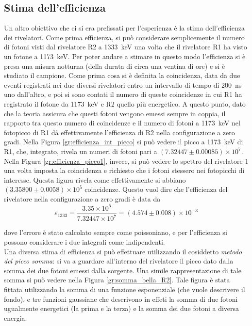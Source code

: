 \subsection{Stima dell'efficienza}
Un altro obiettivo che ci si era prefissati per l'esperienza è la stima dell'efficienza dei rivelatori. Come prima efficienza, si può considerare semplicemente il numero
di fotoni visti dal rivelatore R2 a 1333~keV una volta che il rivelatore R1 ha visto un fotone a 1173~keV. Per poter andare a stimare in questo modo l'efficienza si è presa
una misura notturna (della durata di circa una ventina di ore) e si è studiato il campione. Come prima cosa si è definita la coincidenza, data da due eventi
registrati nei due diversi rivelatori entro un intervallo di tempo di 200~ns uno dall'altro, e poi si sono contati il numero di queste coincidenze in cui R1 ha registrato
il fotone da 1173~keV e R2 quello più energetico. A questo punto, dato che la teoria assicura che questi fotoni vengono emessi sempre in coppia, il rapporto tra questo
numero di coincidenze e il numero di fotoni a 1173~keV nel fotopicco di R1 dà effettivamente l'efficienza di R2 nella configurazione a zero gradi. Nella
Figura \ref{gr:efficienza_int_picco} si può vedere il picco a 1173~keV di R1, che, integrato, rivela un numeri di fotoni pari a $(7.32447 \pm 0.00085)\times 10^7$.
Nella Figura \ref{gr:efficienza_picco1}, invece, si può vedere lo spettro del rivelatore 1 una volta imposta la coincidenza e richiesto che i fotoni stessero
nei fotopicchi di interesse. Questa figura rivela come effettivamente si abbiano $(3.35800 \pm 0.0058)\times 10^5$ coincidenze. Questo vuol dire che l'efficienza del rivelatore nella configurazione
a zero gradi è data da
$$\varepsilon_{1333}=\frac{3.35\times 10^5}{7.32447 \times 10^7}=(4.574 \pm 0.008)\times 10^{-3}$$

%

dove l'errore è stato calcolato sempre come poissoniano, e per l'efficienza si possono considerare i due integrali come indipendenti.\\

\FloatBarrier
Una diversa stima di efficienza si può effettuare utilizzando il cosiddetto \textit{metodo del picco somma}: si va a guardare all'interno del rivelatore il picco dato dalla 
somma dei due fotoni emessi dalla sorgente. Una simile rappresentazione di tale somma si può vedere nella Figura \ref{gr:somma_bella_R2}. Tale figura è stata fittata 
utilizzando la somma di una funzione esponenziale (che vuole descrivere il fondo), e tre funzioni gaussiane che descrivono in effeti la somma di due fotoni ugualmente energetici
(la prima e la terza) e la somma dei due fotoni a diversa energia.\\


